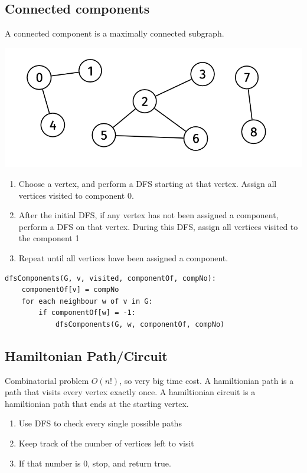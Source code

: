\documentclass[14]{article}
\begin{document}
\subsection{Connected components}
A connected component is a maximally connected subgraph.
\begin{center}
    \includegraphics[scale=0.75]{images/con_comps.png}
\end{center}
\begin{enumerate}
    \item Choose a vertex, and perform a DFS starting at that vertex. Assign all vertices
        visited to component 0. 
    \item After the initial DFS, if any vertex has not been assigned a component,
        perform a DFS on that vertex. During this DFS, assign all vertices visited to
        the component 1
    \item Repeat until all vertices have been assigned a component.
\end{enumerate}
\begin{verbatim}
dfsComponents(G, v, visited, componentOf, compNo):
    componentOf[v] = compNo
    for each neighbour w of v in G:
        if componentOf[w] = -1:
            dfsComponents(G, w, componentOf, compNo)
\end{verbatim}
\subsection{Hamiltonian Path/Circuit}
Combinatorial problem $O(n!)$, so very big time cost. A hamiltionian path is a path that visits every vertex exactly once.
A hamiltionian circuit is a hamiltionian path that ends at the starting vertex.
\begin{enumerate}
    \item Use DFS to check every single possible paths
    \item Keep track of the number of vertices left to visit
    \item If that number is 0, stop, and return true.
\end{enumerate}
\end{document}
